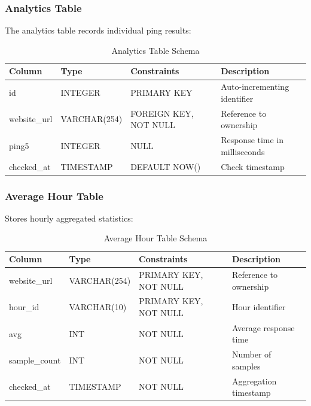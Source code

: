 \subsubsection{Analytics Table}

The analytics table records individual ping results:

\begin{table}[H]
    \centering
    \caption{Analytics Table Schema}
    \label{tab:analytics-schema}
    \begin{tabular}{llll}
        \toprule
        \textbf{Column} & \textbf{Type} & \textbf{Constraints} & \textbf{Description} \\
        \midrule
        id & INTEGER & PRIMARY KEY & Auto-incrementing identifier \\
        website\_url & VARCHAR(254) & FOREIGN KEY, NOT NULL & Reference to ownership \\
        ping5 & INTEGER & NULL & Response time in milliseconds \\
        checked\_at & TIMESTAMP & DEFAULT NOW() & Check timestamp \\
        \bottomrule
    \end{tabular}
\end{table}

\subsubsection{Average Hour Table}

Stores hourly aggregated statistics:

\begin{table}[H]
    \centering
    \caption{Average Hour Table Schema}
    \label{tab:avghour-schema}
    \begin{tabular}{llll}
        \toprule
        \textbf{Column} & \textbf{Type} & \textbf{Constraints} & \textbf{Description} \\
        \midrule
        website\_url & VARCHAR(254) & PRIMARY KEY, NOT NULL & Reference to ownership \\
        hour\_id & VARCHAR(10) & PRIMARY KEY, NOT NULL & Hour identifier \\
        avg & INT & NOT NULL & Average response time \\
        sample\_count & INT & NOT NULL & Number of samples \\
        checked\_at & TIMESTAMP & NOT NULL & Aggregation timestamp \\
        \bottomrule
    \end{tabular}
\end{table}

